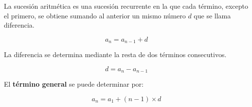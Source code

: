 La sucesión aritmética es una sucesión recurrente en la que cada término, excepto el primero, se obtiene sumando al anterior un mismo número $d$ que se llama diferencia.

$$a_n=a_{n-1}+d$$

La diferencia se determina mediante la resta de dos términos consecutivos.

$$d = a_n - a_{n-1}$$

El \textbf{término general} se puede determinar por:

$$a_n=a_1+(n-1)\times d$$



